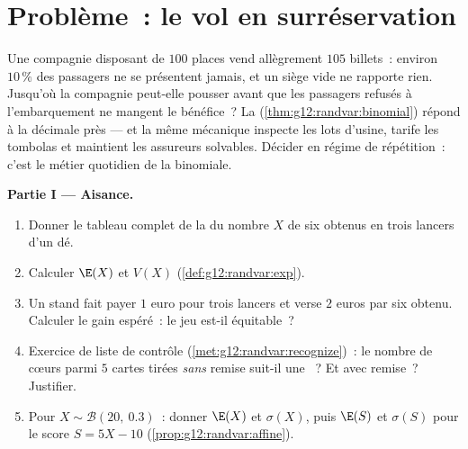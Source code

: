 \section{Problème~: le vol en surréservation}

\begin{problem}
\label{pb:g12:randvar:1}
Une compagnie disposant de $100$ places vend allègrement $105$
billets~: environ $10\,\%$ des passagers ne se présentent jamais, et
un siège vide ne rapporte rien. Jusqu'où la compagnie peut-elle
pousser avant que les passagers refusés à l'embarquement ne mangent
le bénéfice~? La  (\cref{thm:g12:randvar:binomial})
répond à la décimale près --- et la même mécanique inspecte les lots
d'usine, tarife les tombolas et maintient les assureurs solvables.
Décider en régime de répétition~: c'est le métier quotidien de la
binomiale.

\medskip
\noindent\textbf{Partie I --- Aisance.}
\begin{enumerate}
  \item Donner le tableau complet de la  du nombre $X$ de six
        obtenus en trois lancers d'un dé.
  \item Calculer $\E(X)$ et $V(X)$ (\cref{def:g12:randvar:exp}).
  \item Un stand fait payer $1$ euro pour trois lancers et verse
        $2$ euros par six obtenu. Calculer le gain espéré~: le jeu
        est-il équitable~?
  \item Exercice de liste de contrôle
        (\cref{met:g12:randvar:recognize})~: le nombre de cœurs
        parmi $5$ cartes tirées \emph{sans} remise suit-il une ~? Et avec remise~? Justifier.
  \item Pour $X \sim \mathcal B(20,\ 0.3)$~: donner $\E(X)$ et
        $\sigma(X)$, puis $\E(S)$ et $\sigma(S)$ pour le score
        $S = 5X - 10$ (\cref{prop:g12:randvar:affine}).
\end{enumerate}


\end{problem}
